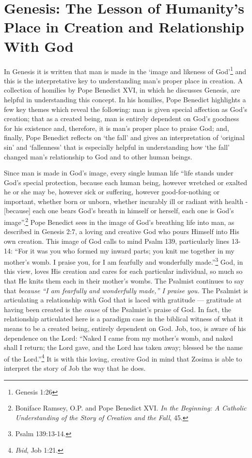 \section{Genesis: The Lesson of Humanity's Place in Creation and Relationship With God}
In Genesis it is written that man is made in the `image and likeness of God'\footnote{Genesis 1:26} and this is the interpretative key to understanding man's proper place in creation. A collection of homilies by Pope Benedict XVI, in which he discusses Genesis, are helpful in understanding this concept. In his homilies, Pope Benedict highlights a few key themes which reveal the following: man is given special affection as God's creation; that as a created being, man is entirely dependent on God's goodness for his existence and, therefore, it is man's proper place to praise God; and, finally, Pope Benedict reflects on `the fall' and gives an interpretation of `original sin' and `fallenness' that is especially helpful in understanding how `the fall' changed man's relationship to God and to other human beings. 

Since man is made in God's image, every single human life ``life stands under God's special protection, because each human being, however wretched or exalted he or she may be, however sick or suffering, however good-for-nothing or important, whether born or unborn, whether incurably ill or radiant with health - [because] each one bears God's breath in himself or herself, each one is God's image''.\footnote{Boniface Ramsey, O.P. and Pope Benedict XVI. \emph{In the Beginning: A Catholic Understanding of the Story of Creation and the Fall}, 45.} Pope Benedict sees in the image of God's breathing life into man, as described in Genesis 2:7, a loving and creative God who pours Himself into His own creation. This image of God calls to mind Psalm 139, particularly lines 13-14: ``For it was you who formed my inward parts; you knit me together in my mother's womb. I praise you, for I am fearfully and wonderfully made.''\footnote{Psalm 139:13-14.} God, in this view, loves His creation and cares for each particular individual, so much so that He knits them each in their mother's wombs. The Psalmist continues to say that \emph{because ``I am fearfully and wonderfully made,'' I praise you.} The Psalmist is articulating a relationship with God that is laced with gratitude --- gratitude at having been created is the \emph{cause} of the Psalmist's praise of God. In fact, the relationship articulated here is a paradigm case in the biblical witness of what it means to be a created being, entirely dependent on God. Job, too, is aware of his dependence on the Lord: ``Naked I came from my mother's womb, and naked shall I return; the Lord gave, and the Lord has taken away; blessed be the name of the Lord.''\footnote{\emph{Ibid}, Job 1:21.} It is with this loving, creative God in mind that Zosima is able to interpret the story of Job the way that he does. 

